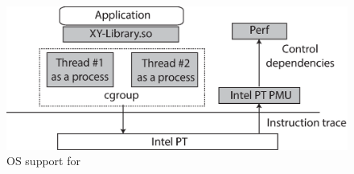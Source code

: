 
\begin{figure}[t]

\centering
      \includegraphics[scale=.35]{figure/PT-os}
  \caption{OS support for \intelpt}
   
  \label{fig:pt-OS-support}

\end{figure}
